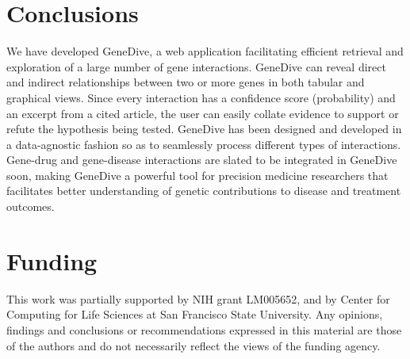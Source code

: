 \documentclass{ws-procs11x85}
\begin{document}
\section{Conclusions}
\label{sec:conclusions}

We have developed GeneDive, a web application facilitating efficient retrieval and exploration of a large number of gene interactions. GeneDive can reveal direct and indirect relationships between two or more genes in both tabular and graphical views. Since every interaction has a confidence score (probability) and an excerpt from a cited article, the user can easily collate evidence to support or refute the hypothesis being tested. GeneDive has been designed and developed in a data-agnostic fashion so as to seamlessly process different types of interactions. Gene-drug and gene-disease interactions are slated to be integrated in GeneDive soon, making GeneDive a powerful tool for precision medicine researchers that facilitates better understanding of genetic contributions to disease and treatment outcomes.


 


\section*{Funding}
This work was partially supported by NIH grant LM005652, and by Center for Computing for Life Sciences at San Francisco State University. Any opinions, findings and conclusions or recommendations expressed in this material are those of the authors and do not necessarily reflect the views of the funding agency. 


\end{document}
